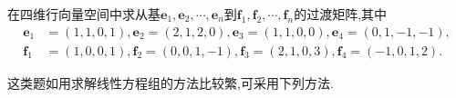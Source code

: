 \documentclass[../../main.tex]{subfiles}%
\begin{document}
\begin{example}
在四维行向量空间中求从基\(\boldsymbol{e}_1,\boldsymbol{e}_2,\cdots,\boldsymbol{e}_n\)到\(\boldsymbol{f}_1,\boldsymbol{f}_2,\cdots,\boldsymbol{f}_n\)的过渡矩阵,其中
\begin{align*}
\boldsymbol{e}_1&=(1,1,0,1),\boldsymbol{e}_2=(2,1,2,0),\boldsymbol{e}_3=(1,1,0,0),\boldsymbol{e}_4=(0,1,-1,-1),\\
\boldsymbol{f}_1&=(1,0,0,1),\boldsymbol{f}_2=(0,0,1,-1),\boldsymbol{f}_3=(2,1,0,3),\boldsymbol{f}_4=(-1,0,1,2).
\end{align*}
\end{example}
\begin{note}
这类题如用求解线性方程组的方法比较繁,可采用下列方法.
\end{note}
\begin{solution}


\end{solution}
\end{document}

